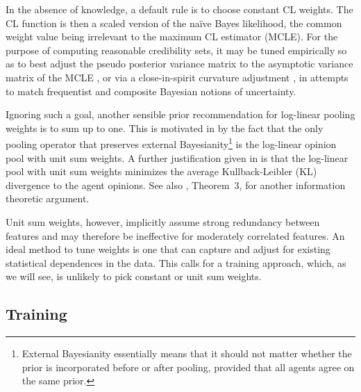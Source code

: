 \documentclass[english]{scrartcl}
\begin{document}

In the absence of knowledge, a default rule is to choose constant CL weights. The CL function is then a scaled version of the na\"ive Bayes likelihood, the common weight value being irrelevant to the maximum CL estimator (MCLE). For the purpose of computing reasonable credibility sets, it may be tuned empirically so as to best adjust the pseudo posterior variance matrix to the asymptotic variance matrix of the MCLE \cite{Pauli-11}, or via a close-in-spirit curvature adjustment \cite{Ribatet-12}, in attempts to match frequentist and composite Bayesian notions of uncertainty.

Ignoring such a goal, another sensible prior recommendation for log-linear pooling weights is to sum up to one. This is motivated in \cite{Genest-86b} by the fact that the only pooling operator that preserves external Bayesianity\footnote{External Bayesianity essentially means that it should not matter whether the prior is incorporated before or after pooling, provided that all agents agree on the same prior.} is the log-linear opinion pool with unit sum weights. A further justification given in \cite{Garg-04} is that the log-linear pool with unit sum weights minimizes the average Kullback-Leibler (KL) divergence to the agent opinions. See also \cite{Wang-14}, Theorem~3, for another information theoretic argument.

Unit sum weights, however, implicitly assume strong redundancy between features and may therefore be ineffective for moderately correlated features. An ideal method to tune weights is one that can capture and adjust for existing statistical dependences in the data. This calls for a training approach, which, as we will see, is unlikely to pick constant or unit sum weights.






\subsection{Training}
\end{document}
